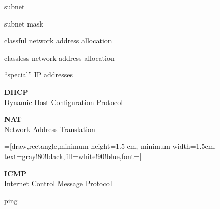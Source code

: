 \begin{cf}[t]
	subnet
\end{cf}
\begin{cf}[t]
	subnet mask
\end{cf}

\begin{cf}[t]
	classful network address allocation
\end{cf}

\begin{cf}[t]
	classless network address allocation
\end{cf}

\begin{cf}[t]
	``special'' IP addresses
\end{cf}

\begin{cf}{
	\textbf{DHCP}\\
	Dynamic Host Configuration Protocol
}
\end{cf}



\begin{cf}{
	\textbf{NAT}\\
	Network Address Translation 
}
\end{cf}

=[draw,rectangle,minimum height=1.5 cm, minimum width=1.5cm, text=gray!80!black,fill=white!90!blue,font=\small]
\begin{cf}[t]{
}
\end{cf}

\begin{cf}{
	\textbf{ICMP}\\
	Internet Control Message Protocol
}
\end{cf}

\begin{cf}[t]
	ping
\end{cf}

